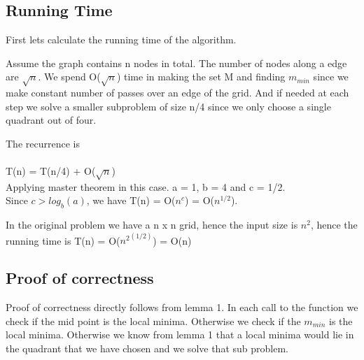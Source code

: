 \documentclass[12pt]{article}
\begin{document}
\begin{algorithm}[H]
  \caption{}
  \begin{algorithmic}[1]
		\Else
			\Else
			\EndIf
		\EndIf
	\EndProcedure
  \end{algorithmic}
\end{algorithm}

\subsection{Running Time}

First lets calculate the running time of the algorithm. 

Assume the graph contains n nodes in total. The number of nodes along a edge are $\sqrt{n}$. We spend O($\sqrt{n}$) time in making the set M and finding $m_{min}$ since we make constant number of passes over an edge of the grid. And if needed at each step we solve a smaller subproblem of size n/4 since we only choose a single quadrant out of four.

The recurrence is \\\\
T(n) = T(n/4) + O($\sqrt{n}$)
\\
Applying master theorem in this case. a = 1, b = 4 and c = 1/2. \\
Since $c > log_b(a)$, we have
T(n) = O($n^{c}$) = O($n^{1/2}$).

In the original problem we have a n x n grid, hence the input size is $n^2$, hence the running time is T(n) = O(${n^2}^{(1/2)}$) = O(n)
		
\subsection{Proof of correctness}
Proof of correctness directly follows from lemma 1. In each call to the function we check if the mid point is the local minima. Otherwise we check if the $m_{min}$ is the local minima. Otherwise we know from lemma 1 that a local minima would lie in the quadrant that we have chosen and we solve that sub problem. 
\end{document}
